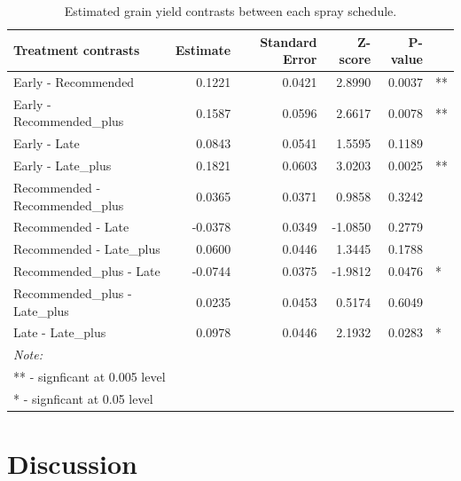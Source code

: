 \documentclass[agronomy,article,submit,moreauthors,pdftex]{mdpi}
\begin{document}
\begin{table}

\caption{\label{tab:table3_Contrasts}Estimated grain yield contrasts between each spray schedule.}
\centering
\begin{tabular}[t]{lrrrrl}
\toprule
Treatment contrasts & Estimate & Standard Error & Z-score & P-value &  \\
\midrule
Early - Recommended & 0.1221 & 0.0421 & 2.8990 & 0.0037 & **\\
Early - Recommended\_plus & 0.1587 & 0.0596 & 2.6617 & 0.0078 & **\\
Early - Late & 0.0843 & 0.0541 & 1.5595 & 0.1189 & \\
Early - Late\_plus & 0.1821 & 0.0603 & 3.0203 & 0.0025 & **\\
Recommended - Recommended\_plus & 0.0365 & 0.0371 & 0.9858 & 0.3242 & \\
\addlinespace
Recommended - Late & -0.0378 & 0.0349 & -1.0850 & 0.2779 & \\
Recommended - Late\_plus & 0.0600 & 0.0446 & 1.3445 & 0.1788 & \\
Recommended\_plus - Late & -0.0744 & 0.0375 & -1.9812 & 0.0476 & *\\
Recommended\_plus - Late\_plus & 0.0235 & 0.0453 & 0.5174 & 0.6049 & \\
Late - Late\_plus & 0.0978 & 0.0446 & 2.1932 & 0.0283 & *\\
\bottomrule
\multicolumn{6}{l}{\textit{Note: }}\\
\multicolumn{6}{l}{** - signficant at 0.005 level}\\
\multicolumn{6}{l}{* - signficant at 0.05 level}\\
\end{tabular}
\end{table}

\hypertarget{discussion}{%
\section{Discussion}\label{discussion}}
\end{document}
